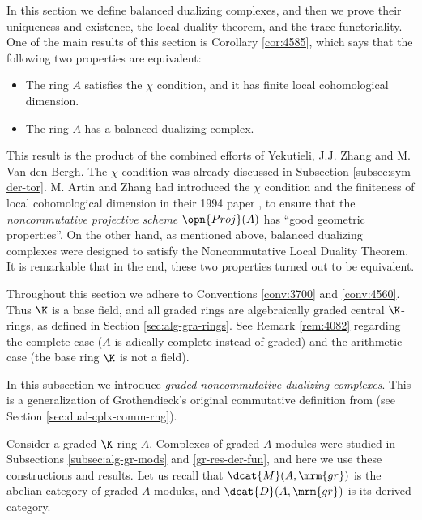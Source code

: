 In this section we define balanced dualizing complexes, and then we prove their 
uniqueness and existence, the local duality theorem, and the trace 
functoriality. One of the main results of this section is Corollary 
\ref{cor:4585}, which says that the following two properties are equivalent:
\begin{itemize}
\item[(i)] The ring $A$ satisfies the $\chi$ condition, and it has 
finite local cohomological dimension.

\item[(ii)] The ring $A$ has a balanced dualizing complex.
\end{itemize}
This result is the product of the combined efforts of 
Yekutieli, J.J. Zhang and M. Van den Bergh.
The $\chi$ condition was already discussed in Subsection 
\ref{subsec:sym-der-tor}. M. Artin and Zhang had introduced the $\chi$ 
condition and the finiteness of local cohomological dimension in their 1994 
paper \cite{ArZh}, to ensure that the {\em noncommutative projective scheme} 
$\opn{Proj}(A)$ has ``good geometric properties''. On the other hand, as 
mentioned above, balanced dualizing complexes were designed to satisfy the 
Noncommutative Local Duality Theorem. It is 
remarkable that in the end, these two properties turned out to be equivalent. 

Throughout this section we adhere to Conventions \ref{conv:3700} and 
\ref{conv:4560}. Thus $\K$ is a base field, and all graded rings are 
algebraically graded central $\K$-rings, 
as defined in Section \ref{sec:alg-gra-rings}.
See Remark \ref{rem:4082} regarding the complete case ($A$ is adically complete 
instead of graded) and the arithmetic case (the base ring $\K$ is not a field). 


\label{subsec:graded-NCDC}

In this subsection we introduce {\em graded noncommutative dualizing 
complexes}. This is a generalization of Grothendieck's original commutative 
definition from \cite{RD} (see Section \ref{sec:dual-cplx-comm-rng}). 

Consider a graded $\K$-ring $A$. 
Complexes of graded $A$-modules were studied in Subsections 
\ref{subsec:alg-gr-mods} and \ref{gr-res-der-fun}, and here we use these 
constructions and results. 
Let us recall that $\dcat{M}(A, \mrm{gr})$ is the abelian category of graded 
$A$-modules, and $\dcat{D}(A, \mrm{gr})$ is its derived category. 

